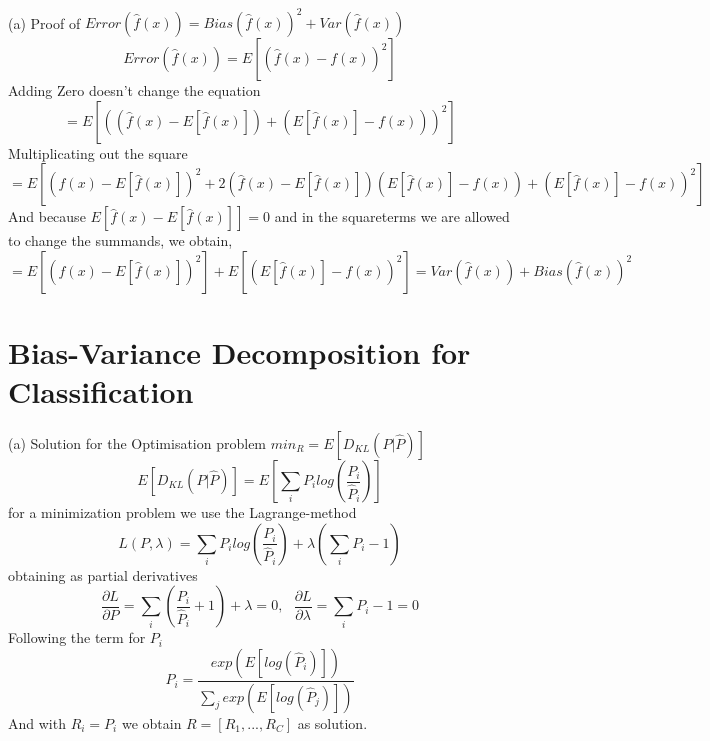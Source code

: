 \documentclass[]{article}
\begin{document}
\paragraph{}
(a) Proof of $Error(\hat{f}(x)) = Bias(\hat{f}(x))^2 + Var(\hat{f}(x))$
	\begin{displaymath}
	Error(\hat{f}(x)) = E[(\hat{f}(x)-f(x))^2]
	\end{displaymath}
	Adding Zero doesn't change the equation
	\begin{displaymath}
	=E[((\hat{f}(x) - E[\hat{f}(x)]) + (E[\hat{f}(x)] -f(x)))^2]
	\end{displaymath}
	Multiplicating out the square
	\begin{displaymath}
	= E[(\hat{f}(x)-E[\hat{f}(x)])^2 + 2(\hat{f}(x) - E[\hat{f}(x)])(E[\hat{f}(x)] -f(x)) + (E[\hat{f}(x)] -f(x))^2]
	\end{displaymath}
	And because $E[\hat{f}(x) - E[\hat{f}(x)]] = 0$ and in the squareterms we are allowed to change the summands, we obtain,
	\begin{displaymath}
	= E[(\hat{f}(x)-E[\hat{f}(x)])^2] + E[(E[\hat{f}(x)] -f(x))^2] =  Var(\hat{f}(x)) + Bias(\hat{f}(x))^2
	\end{displaymath}
\paragraph{}
\section{Bias-Variance Decomposition for Classification}
\paragraph{}
(a) Solution for the Optimisation problem $min_R = E[D_{KL}(P|\hat{P})]$
	\begin{displaymath}
	E[D_{KL}(P|\hat{P})] = E[\sum_i P_i log(\frac{P_i}{\hat{P}_i})]
	\end{displaymath}
	for a minimization problem we use the Lagrange-method
	\begin{displaymath}
	L(P,\lambda) = \sum_i P_i log(\frac{P_i}{\hat{P}_i}) + \lambda(\sum_i P_i -1)
	\end{displaymath}
	obtaining as partial derivatives
	\begin{displaymath}
	\frac{\partial L}{\partial P} = \sum_i (\frac{P_i}{\hat{P}_i}+1)+\lambda = 0 , \ \ \
	\frac{\partial L}{\partial \lambda} = \sum_i P_i - 1 = 0
	\end{displaymath}
	Following the term for $P_i$
	\begin{displaymath}
	P_i = \frac{exp(E[log(\hat{P}_i)])}{\sum_j exp(E[log(\hat{P}_j)])}
	\end{displaymath}
	And with $R_i = P_i$ we obtain $R= [R_1,...,R_C]$ as solution.
\end{document}

